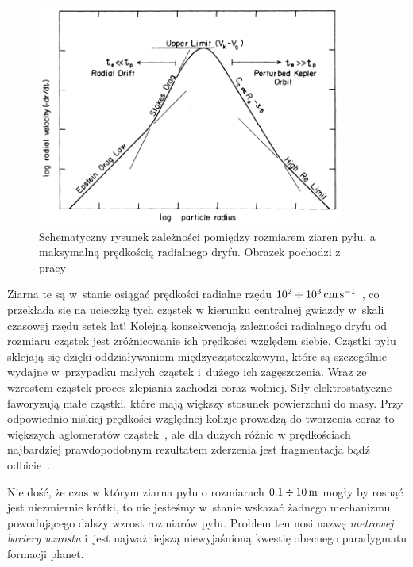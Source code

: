 \begin{figure}
   \includegraphics[width=0.9\textwidth]{figures/chap1_drift.png}
   \caption{Schematyczny rysunek zależności pomiędzy rozmiarem ziaren pyłu, a
   maksymalną prędkością radialnego dryfu. Obrazek pochodzi z
   pracy~\cite{W77}}
   \label{fig:chap1_drift}
\end{figure}

Ziarna te są w~stanie osiągać prędkości radialne rzędu
$10^2\div10^3\hbox{$\thinspace\textrm{cm}$}\hbox{$\thinspace\textrm{s}$}^{-1}$~\cite{W77}, co przekłada się na ucieczkę tych cząstek w
kierunku centralnej gwiazdy w~skali czasowej rzędu setek lat!  Kolejną
konsekwencją zależności radialnego dryfu od rozmiaru cząstek jest zróżnicowanie
ich prędkości względem siebie. Cząstki pyłu sklejają się dzięki oddziaływaniom
międzycząsteczkowym, które są szczególnie wydajne w~przypadku małych cząstek
i~dużego ich zagęszczenia. Wraz ze wzrostem cząstek proces zlepiania zachodzi
coraz wolniej.  Siły elektrostatyczne faworyzują małe cząstki, które mają większy stosunek
powierzchni do masy. Przy odpowiednio niskiej prędkości względnej kolizje
prowadzą do tworzenia coraz to większych aglomeratów cząstek~\citep{BW08}, ale
dla dużych różnic w prędkościach najbardziej prawdopodobnym rezultatem zderzenia
jest fragmentacja bądź odbicie~\citep{Z10}. 

\par Nie dość, że czas w którym ziarna pyłu o rozmiarach $0.1 \div 10\hbox{$\thinspace\textrm{m}$}$ mogły
by rosnąć jest niezmiernie krótki, to nie jesteśmy w~stanie wskazać żadnego
mechanizmu powodującego dalszy wzrost rozmiarów pyłu. Problem ten nosi nazwę
\emph{metrowej bariery wzrostu} i~jest najważniejszą niewyjaśnioną kwestię
obecnego paradygmatu formacji planet. 

